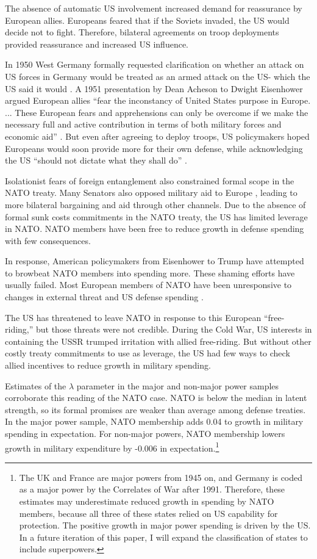 \documentclass[12pt]{article}
\begin{document}
The absence of automatic US involvement increased demand for reassurance by European allies. 
Europeans feared that if the Soviets invaded, the US would decide not to fight. 
Therefore, bilateral agreements on troop deployments provided reassurance and increased US influence. 


In 1950 West Germany formally requested clarification on whether an attack on US forces in Germany would be treated as an armed attack on the US- which the US said it would \citep[pg. 395]{Acheson1969}. 
A 1951 presentation by Dean Acheson to Dwight Eisenhower argued European allies ``fear the inconstancy of United States purpose in Europe. ... These European fears and apprehensions can only be overcome if we make the necessary full and active contribution in terms of both military forces and economic aid'' \citep[pg. 3]{Acheson1951}.  
But even after agreeing to deploy troops, US policymakers hoped Europeans would soon provide more for their own defense, while acknowledging the US ``should not dictate what they shall do'' \citep[pg. 2]{Johnson1950}. 


Isolationist fears of foreign entanglement also constrained formal scope in the NATO treaty. 
Many Senators also opposed military aid to Europe \citep[pg 285]{Acheson1969}, leading to more bilateral bargaining and aid through other channels. 
Due to the absence of formal sunk costs commitments in the NATO treaty, the US has limited leverage in NATO. 
NATO members have been free to reduce growth in defense spending with few consequences. 


In response, American policymakers from Eisenhower to Trump have attempted to browbeat NATO members into spending more. 
These shaming efforts have usually failed. 
Most European members of NATO have been unresponsive to changes in external threat and US defense spending \citep{PluemperNeumayer2015}. 


The US has threatened to leave NATO in response to this European ``free-riding,'' but those threats were not credible. 
During the Cold War, US interests in containing the USSR trumped irritation with allied free-riding.  
But without other costly treaty commitments to use as leverage, the US had few ways to check allied incentives to reduce growth in military spending. 


Estimates of the $\lambda$ parameter in the major and non-major power samples corroborate this reading of the NATO case. 
NATO is below the median in latent strength, so its formal promises are weaker than average among defense treaties. 
In the major power sample, NATO membership adds 0.04 to growth in military spending in expectation.
For non-major powers, NATO membership lowers growth in military expenditure by -0.006 in expectation.\footnote{
The UK and France are major powers from 1945 on, and Germany is coded as a major power by the Correlates of War after 1991. Therefore, these estimates may underestimate reduced growth in spending by NATO members, because all three of these states relied on US capability for protection. The positive growth in major power spending is driven by the US. In a future iteration of this paper, I will expand the classification of states to include superpowers.}
\end{document}

